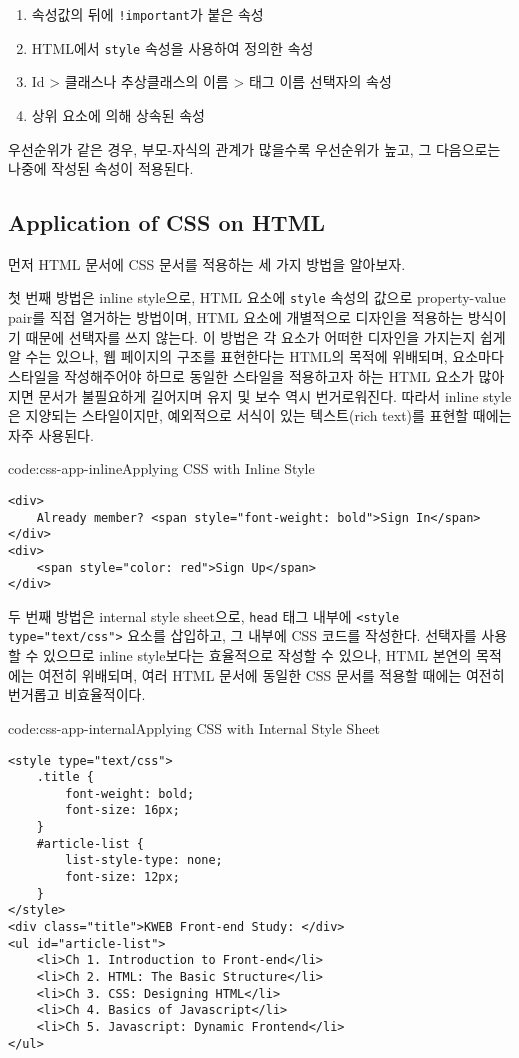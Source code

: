 \begin{enumerate}
    \item 속성값의 뒤에 \texttt{!important}가 붙은 속성
    \item HTML에서 \texttt{style} 속성을 사용하여 정의한 속성
    \item Id {\textgreater} 클래스나 추상클래스의 이름 {\textgreater} 태그 이름 선택자의 속성
    \item 상위 요소에 의해 상속된 속성
\end{enumerate}

우선순위가 같은 경우, 부모-자식의 관계가 많을수록 우선순위가 높고, 그 다음으로는 나중에 작성된 속성이 적용된다.

\subsection*{Application of CSS on HTML}
먼저 HTML 문서에 CSS 문서를 적용하는 세 가지 방법을 알아보자.

첫 번째 방법은 inline style으로, HTML 요소에 \texttt{style} 속성의 값으로 property-value pair를 직접 열거하는 방법이며, HTML 요소에 개별적으로 디자인을 적용하는 방식이기 때문에 선택자를 쓰지 않는다. 이 방법은 각 요소가 어떠한 디자인을 가지는지 쉽게 알 수는 있으나, 웹 페이지의 구조를 표현한다는 HTML의 목적에 위배되며, 요소마다 스타일을 작성해주어야 하므로 동일한 스타일을 적용하고자 하는 HTML 요소가 많아지면 문서가 불필요하게 길어지며 유지 및 보수 역시 번거로워진다. 따라서 inline style은 지양되는 스타일이지만, 예외적으로 서식이 있는 텍스트(rich text)를 표현할 때에는 자주 사용된다.

\begin{codeenv}{code:css-app-inline}{Applying CSS with Inline Style}\begin{verbatim}
<div>
    Already member? <span style="font-weight: bold">Sign In</span>
</div>
<div>
    <span style="color: red">Sign Up</span>
</div>
\end{verbatim}
\end{codeenv}

두 번째 방법은 internal style sheet으로, \texttt{head} 태그 내부에 \texttt{<style type="text/css">} 요소를 삽입하고, 그 내부에 CSS 코드를 작성한다. 선택자를 사용할 수 있으므로 inline style보다는 효율적으로 작성할 수 있으나, HTML 본연의 목적에는 여전히 위배되며, 여러 HTML 문서에 동일한 CSS 문서를 적용할 때에는 여전히 번거롭고 비효율적이다.

\begin{codeenv}{code:css-app-internal}{Applying CSS with Internal Style Sheet}\begin{verbatim}
<style type="text/css">
    .title {
        font-weight: bold;
        font-size: 16px;
    }
    #article-list {
        list-style-type: none;
        font-size: 12px;
    }
</style>
<div class="title">KWEB Front-end Study: </div>
<ul id="article-list">
    <li>Ch 1. Introduction to Front-end</li>
    <li>Ch 2. HTML: The Basic Structure</li>
    <li>Ch 3. CSS: Designing HTML</li>
    <li>Ch 4. Basics of Javascript</li>
    <li>Ch 5. Javascript: Dynamic Frontend</li>
</ul>
\end{verbatim}
\end{codeenv}
\newpage

